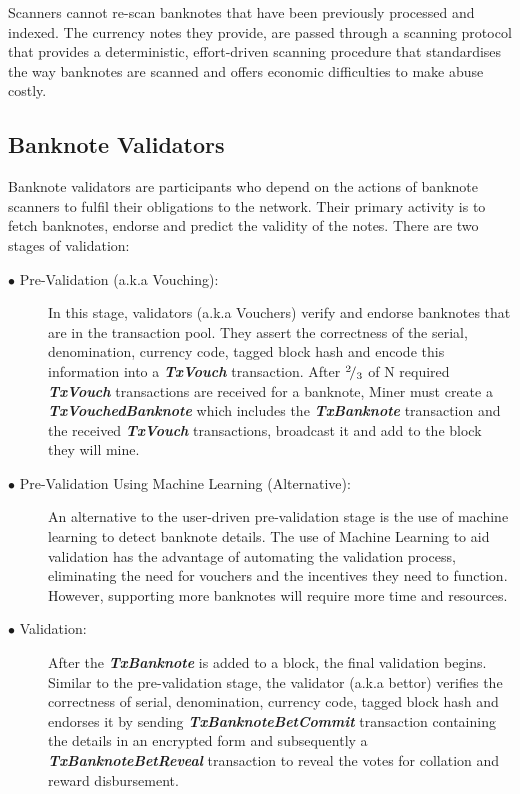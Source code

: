 Scanners cannot re-scan banknotes that have been previously processed and indexed. The currency notes they provide, are passed through a scanning protocol that provides a deterministic, effort-driven scanning procedure that standardises the way banknotes are scanned and offers economic difficulties to make abuse costly.   


\subsection{Banknote Validators}

Banknote validators are participants who depend on the actions of banknote scanners to fulfil their obligations to the network. Their primary activity is to fetch banknotes, endorse and predict the validity of the notes. There are two stages of validation:

\begin{description}
  \item[$\bullet$ Pre-Validation (a.k.a Vouching):] In this stage, validators (a.k.a Vouchers) verify and endorse banknotes that are in the transaction pool. They assert the correctness of the serial, denomination, currency code, tagged block hash and encode this information into a \textbf{\textit{TxVouch}} transaction. After ${}^{2}\!/_{3}$ of N required \textbf{\textit{TxVouch}} transactions are received for a banknote, Miner must create a \textbf{\textit{TxVouchedBanknote}} which includes the \textbf{\textit{TxBanknote}} transaction and the received \textbf{\textit{TxVouch}} transactions, broadcast it and add to the block they will mine.

  \newpage
  \item[$\bullet$ Pre-Validation Using Machine Learning (Alternative):] An alternative to the user-driven pre-validation stage is the use of machine learning to detect banknote details. The use of Machine Learning to aid validation has the advantage of automating the validation process, eliminating the need for vouchers and the incentives they need to function. However, supporting more banknotes will require more time and resources. 
  
   \item[$\bullet$ Validation:] After the \textbf{\textit{TxBanknote}} is added to a block, the final validation begins. Similar to the pre-validation stage, the validator (a.k.a bettor) verifies the correctness of serial, denomination, currency code, tagged block hash and endorses it by sending  \textbf{\textit{TxBanknoteBetCommit}} transaction containing the details in an encrypted form and subsequently a \textbf{\textit{TxBanknoteBetReveal}} transaction to reveal the votes for collation and reward disbursement.
 \end{description}
 
